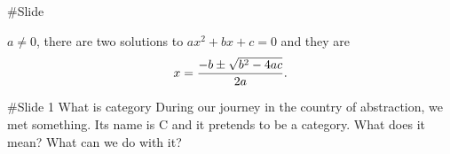 #Slide

 \(a \ne 0\), there are two solutions to \(ax^2 + bx + c = 0\) and they are
$$x = {-b \pm \sqrt{b^2-4ac} \over 2a}.$$


#Slide
1 What is category
During our journey in the country of abstraction, we met something. Its name is C and it pretends to be a category. What does it mean? What can we do with it?
